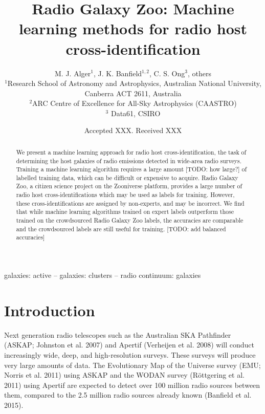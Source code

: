 \documentclass[fleqn,usenatbib,usedcolumn]{mnras}
\title[ML CDFS]{Radio Galaxy Zoo: Machine learning methods for radio host cross-identification}
\author[RGZ ML Team]{M. J. Alger$^{1}$, J. K. Banfield$^{1, 2}$, C. S. Ong$^{3}$, others
\\
$^{1}$Research School of Astronomy and Astrophysics, Australian National University, Canberra ACT 2611, Australia\\
$^{2}$ARC Centre of Excellence for All-Sky Astrophysics (CAASTRO)\\
$^{3}$ Data61, CSIRO\\
}
\date{Accepted XXX. Received XXX}
\begin{document}
\label{firstpage}
\pagerange{\pageref{firstpage}--\pageref{lastpage}}
\maketitle

\begin{abstract}
  We present a machine learning approach for radio host cross-identification, the task of determining the host galaxies of radio emissions detected in wide-area radio surveys. Training a machine learning algorithm requires a large amount [TODO: how large?] of labelled training data, which can be difficult or expensive to acquire. Radio Galaxy Zoo, a citizen science project on the Zooniverse platform, provides a large number of radio host cross-identifications which may be used as labels for training. However, these cross-identifications are assigned by non-experts, and may be incorrect. We find that while machine learning algorithms trained on expert labels outperform those trained on the crowdsourced Radio Galaxy Zoo labels, the accuracies are comparable and the crowdsourced labels are still useful for training. [TODO: add balanced accuracies]
\end{abstract}

\begin{keywords}
galaxies: active -- galaxies: clusters -- radio continuum: galaxies
\end{keywords}


\section{Introduction}\label{introduction}

  Next generation radio telescopes such as the Australian SKA Pathfinder
  (ASKAP; Johnston et al. 2007) and Apertif (Verheijen et al. 2008) will
  conduct increasingly wide, deep, and high-resolution surveys. These
  surveys will produce very large amounts of data. The Evolutionary Map of
  the Universe survey (EMU; Norris et al. 2011) using ASKAP and the WODAN
  survey (Röttgering et al. 2011) using Apertif are expected to detect
  over 100 million radio sources between them, compared to the 2.5 million
  radio sources already known (Banfield et al. 2015).
\end{document}
